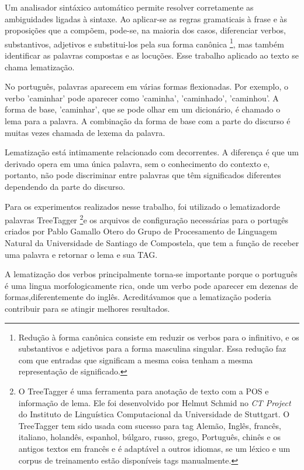 Um analisador sintáxico automático permite resolver corretamente as ambiguidades ligadas à sintaxe. Ao aplicar-se as
regras gramaticais à frase e às proposições que a compõem, pode-se, na maioria dos casos, diferenciar verbos,
substantivos, adjetivos e substitui-los pela sua forma canônica \footnote{Redução à forma canônica consiste em reduzir os verbos para o infinitivo, e os substantivos e adjetivos para a forma masculina singular. Essa redução faz com que entradas que significam a mesma coisa tenham a mesma representação de significado.}, mas também identificar as palavras compostas e as locuções. Esse trabalho aplicado ao texto se chama
lematização.

No português, palavras aparecem em várias formas flexionadas. Por exemplo, o verbo 'caminhar' pode aparecer como 'caminha', 'caminhado', 'caminhou'. A forma de base, 'caminhar', que se pode olhar em um dicionário, é chamado o lema para a palavra. A combinação da forma de base com a parte do discurso é muitas vezes chamada de lexema da palavra.

Lematização está intimamente relacionado com decorrentes. A diferença é que um derivado opera em uma única palavra, sem o conhecimento do contexto e, portanto, não pode discriminar entre palavras que têm significados diferentes dependendo da parte do discurso.

Para os experimentos realizados nesse trabalho, foi utilizado o lematizadorde palavras TreeTagger \footnote{O TreeTagger é uma ferramenta para anotação de texto com a POS e informação de lema. Ele foi desenvolvido por Helmut Schmid no \emph{CT Project} do Instituto de Linguística Computacional da Universidade de Stuttgart. O TreeTagger tem sido usada com sucesso para tag Alemão, Inglês, francês, italiano, holandês, espanhol, búlgaro, russo, grego, Português, chinês e os antigos textos em francês e é adaptável a outros idiomas, se um léxico e um corpus de treinamento estão disponíveis tags manualmente.}e os arquivos de configuração necessárias para o portugês criados por Pablo Gamallo Otero do Grupo de Procesamento de Linguagem Natural da Universidade de Santiago de Compostela, que tem a função de receber uma palavra e retornar o lema e sua TAG.

A lematização dos verbos principalmente torna-se importante porque o português é uma lingua morfologicamente rica, onde um verbo pode aparecer em dezenas de formas,diferentemente do inglês. Acreditávamos que a lematização poderia contribuir para se atingir melhores resultados.




